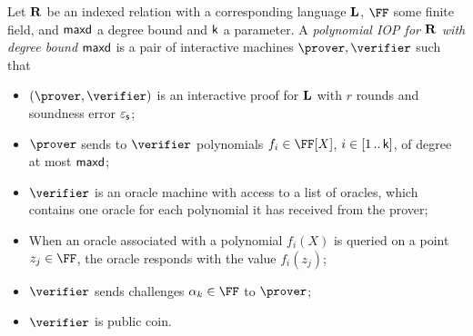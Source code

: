 \documentclass[runningheads,11pt]{llncs}
\begin{document}


\begin{definition}
  Let $\mathbf{R}$ be an indexed relation with a corresponding language $\mathbf{L}$, $\FF$
  some finite field, and $\mathsf{maxd}$ a degree bound and $\mathsf{k}$ a parameter. A
  \emph{polynomial IOP for $\mathbf{R}$ with degree bound $\mathsf{maxd}$} is a pair of
  interactive machines $\prover, \verifier$ such that
\begin{itemize}
\item $(\prover, \verifier)$ is an interactive proof for $\mathbf{L}$ with $r$ rounds
  and soundness error $\varepsilon_{\mathsf{s}}$;
\item $\prover$ sends to $\verifier$ polynomials $f_i \in \FF[X]$,
  $i \in [1 \, .. \, \mathsf{k}]$, of degree at most $\mathsf{maxd}$;
\item $\verifier$ is an oracle machine with access to a list of oracles, which
  contains one oracle for each polynomial it has received from the prover;
\item When an oracle associated with a polynomial $f_i(X)$ is queried on a point
  $z_j \in \FF$, the oracle responds with the value $f_i(z_j)$; 
\item $\verifier$ sends challenges $\alpha_k \in \FF$ to $\prover$;
\item $\verifier$ is public coin.
\end{itemize}
\end{definition}
\end{document}
